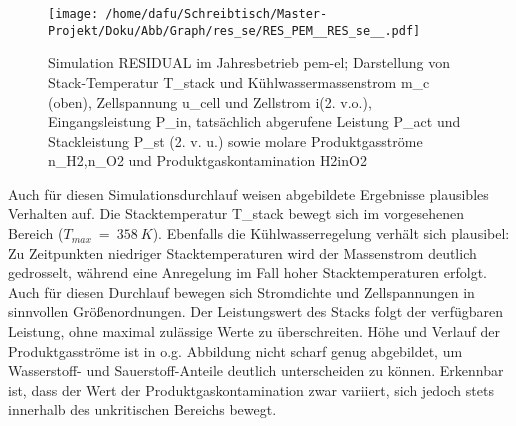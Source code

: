 \documentclass[onecolumn,10pt,titlepage]{article}
\begin{document}
\begin{figure}[H]
	\centering
	\texttt{[image: /home/dafu/Schreibtisch/Master-Projekt/Doku/Abb/Graph/res\_se/RES\_PEM\_\_RES\_se\_\_.pdf]}
	
	\caption[Simulation RESIDUAL im Jahresbetrieb \gls{pem}-\gls{el}]{Simulation RESIDUAL im Jahresbetrieb \gls{pem}-\gls{el}; Darstellung von Stack-Temperatur \gls{T_stack} und Kühlwassermassenstrom \gls{m_c} (oben), Zellspannung \gls{u_cell} und Zellstrom \gls{i}(2. v.o.), Eingangsleistung \gls{P_in},  tatsächlich abgerufene Leistung \gls{P_act} und Stackleistung \gls{P_st} (2. v. u.) sowie molare Produktgasströme \gls{n_H2},\gls{n_O2} und Produktgaskontamination \gls{H2inO2}}
	\label{fig:plt_se_RES_PEM} 
\end{figure}
Auch für diesen Simulationsdurchlauf weisen abgebildete Ergebnisse plausibles Verhalten auf. Die Stacktemperatur \gls{T_stack} bewegt sich im vorgesehenen Bereich ($T_{max}~=~358~K$). Ebenfalls die Kühlwasserregelung verhält sich plausibel: Zu Zeitpunkten niedriger Stacktemperaturen wird der Massenstrom deutlich gedrosselt, während eine Anregelung im Fall hoher Stacktemperaturen erfolgt. Auch für diesen Durchlauf bewegen sich Stromdichte und Zellspannungen in sinnvollen Größenordnungen. Der Leistungswert des Stacks folgt der verfügbaren Leistung, ohne maximal zulässige Werte zu überschreiten.
Höhe und Verlauf der Produktgasströme ist in o.g. Abbildung nicht scharf genug abgebildet, um Wasserstoff- und Sauerstoff-Anteile deutlich unterscheiden zu können. Erkennbar ist, dass der Wert der Produktgaskontamination zwar variiert, sich jedoch stets innerhalb des unkritischen Bereichs bewegt.
\end{document}
